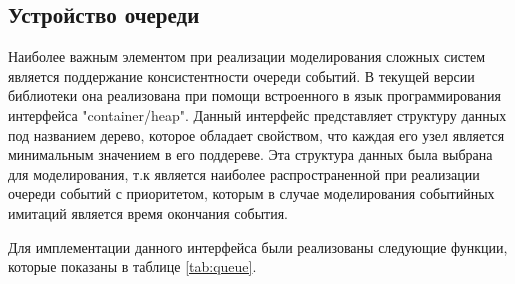 \subsection{Устройство очереди}

Наиболее важным элементом при реализации моделирования сложных систем является поддержание консистентности очереди событий. В текущей версии библиотеки она реализована при помощи встроенного в язык программирования интерфейса "container/heap". Данный интерфейс представляет структуру данных под названием дерево, которое обладает свойством, что каждая его узел является минимальным значением в его поддереве. Эта структура данных была выбрана для моделирования, т.к является наиболее распространенной при реализации очереди событий с приоритетом, которым в случае моделирования событийных имитаций является время окончания события. 

Для имплементации данного интерфейса были реализованы следующие функции, которые показаны в таблице \ref{tab:queue}. 

